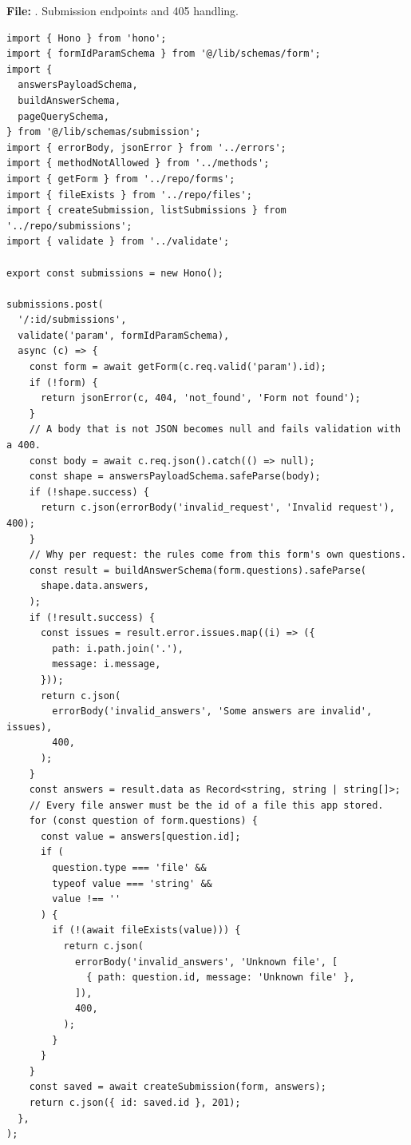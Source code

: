 \documentclass[11pt,a4paper]{article}
\begin{document}
\textbf{File:} . Submission endpoints and 405 handling.\par
\begin{lstlisting}
import { Hono } from 'hono';
import { formIdParamSchema } from '@/lib/schemas/form';
import {
  answersPayloadSchema,
  buildAnswerSchema,
  pageQuerySchema,
} from '@/lib/schemas/submission';
import { errorBody, jsonError } from '../errors';
import { methodNotAllowed } from '../methods';
import { getForm } from '../repo/forms';
import { fileExists } from '../repo/files';
import { createSubmission, listSubmissions } from '../repo/submissions';
import { validate } from '../validate';

export const submissions = new Hono();

submissions.post(
  '/:id/submissions',
  validate('param', formIdParamSchema),
  async (c) => {
    const form = await getForm(c.req.valid('param').id);
    if (!form) {
      return jsonError(c, 404, 'not_found', 'Form not found');
    }
    // A body that is not JSON becomes null and fails validation with a 400.
    const body = await c.req.json().catch(() => null);
    const shape = answersPayloadSchema.safeParse(body);
    if (!shape.success) {
      return c.json(errorBody('invalid_request', 'Invalid request'), 400);
    }
    // Why per request: the rules come from this form's own questions.
    const result = buildAnswerSchema(form.questions).safeParse(
      shape.data.answers,
    );
    if (!result.success) {
      const issues = result.error.issues.map((i) => ({
        path: i.path.join('.'),
        message: i.message,
      }));
      return c.json(
        errorBody('invalid_answers', 'Some answers are invalid', issues),
        400,
      );
    }
    const answers = result.data as Record<string, string | string[]>;
    // Every file answer must be the id of a file this app stored.
    for (const question of form.questions) {
      const value = answers[question.id];
      if (
        question.type === 'file' &&
        typeof value === 'string' &&
        value !== ''
      ) {
        if (!(await fileExists(value))) {
          return c.json(
            errorBody('invalid_answers', 'Unknown file', [
              { path: question.id, message: 'Unknown file' },
            ]),
            400,
          );
        }
      }
    }
    const saved = await createSubmission(form, answers);
    return c.json({ id: saved.id }, 201);
  },
);


\end{lstlisting}
\end{document}
